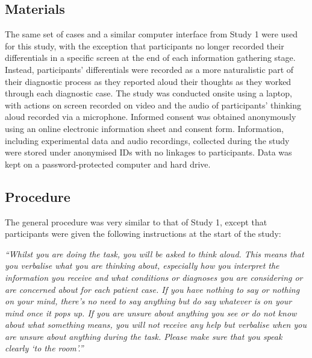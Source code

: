 \documentclass[a4paper, nobind]{templates/ociamthesis}
\begin{document}
\subsection*{Materials}\label{materials-1}

The same set of cases and a similar computer interface from Study 1 were used for this study, with the exception that participants no longer recorded their differentials in a specific screen at the end of each information gathering stage. Instead, participants' differentials were recorded as a more naturalistic part of their diagnostic process as they reported aloud their thoughts as they worked through each diagnostic case. The study was conducted onsite using a laptop, with actions on screen recorded on video and the audio of participants' thinking aloud recorded via a microphone. Informed consent was obtained anonymously using an online electronic information sheet and consent form. Information, including experimental data and audio recordings, collected during the study were stored under anonymised IDs with no linkages to participants. Data was kept on a password-protected computer and hard drive.

\subsection*{Procedure}\label{procedure-1}

The general procedure was very similar to that of Study 1, except that participants were given the following instructions at the start of the study:

\emph{``Whilst you are doing the task, you will be asked to think aloud. This means that you verbalise what you are thinking about, especially how you interpret the information you receive and what conditions or diagnoses you are considering or are concerned about for each patient case. If you have nothing to say or nothing on your mind, there's no need to say anything but do say whatever is on your mind once it pops up. If you are unsure about anything you see or do not know about what something means, you will not receive any help but verbalise when you are unsure about anything during the task. Please make sure that you speak clearly `to the room'.''}
\end{document}
